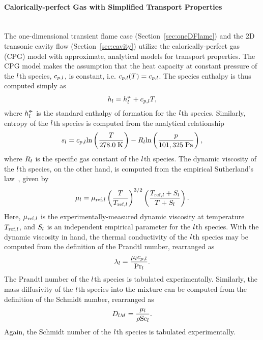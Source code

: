 \paragraph*{Calorically-perfect Gas with Simplified Transport Properties}\mbox{}\\

The one-dimensional transient flame case (Section~\ref{sec:oneDFlame}) and the 2D transonic cavity flow (Section~\ref{sec:cavity}) utilize the calorically-perfect gas (CPG) model with approximate, analytical models for transport properties. The CPG model makes the assumption that the heat capacity at constant pressure of the $l$th species, $c_{p,l}$, is constant, i.e. $c_{p,l}(T) = c_{p,l}$. The species enthalpy is thus computed simply as
%
\begin{equation}\label{eq:cpgEnthSpec}
	h_{l} = h^{\circ\kern-0.47em-}_{l} + c_{p,l} T,
\end{equation}
%
where $h^{\circ\kern-0.47em-}_{l}$ is the standard enthalpy of formation for the $l$th species. Similarly, entropy of the $l$th species is computed from the analytical relationship
%
\begin{equation}\label{eq:cpgEntropySpec}
	s_{l} = c_{p,l} \text{ln}\left(\frac{T}{278.0 \; \text{K}}\right) - R_{l} \text{ln}\left(\frac{p}{101,325 \; \text{Pa}}\right),
\end{equation}
%
where $R_{l}$ is the specific gas constant of the $l$th species. The dynamic viscosity of the $l$th species, on the other hand, is computed from the empirical Sutherland's law~\cite{Sutherland1893}, given by
%
\begin{equation}\label{eq:viscSuthSpec}
	\mu_{l} = \mu_{\text{ref},l} \left( \frac{T}{T_{\text{ref},l}} \right)^{3/2} \left( \frac{T_{\text{ref},l} + S_{l}}{T + S_{l}} \right).
\end{equation}
%
Here, $\mu_{\text{ref},l}$ is the experimentally-measured dynamic viscosity at temperature $T_{\text{ref},l}$, and $S_{l}$ is an independent empirical parameter for the $l$th species. With the dynamic viscosity in hand, the thermal conductivity of the $l$th species may be computed from the definition of the Prandtl number, rearranged as
%
\begin{equation}\label{eq:cpgThermCondSpec}
	\lambda_{l} = \frac{\mu_{l} c_{p,l}}{\text{Pr}_{l}}.
\end{equation}
%
The Prandtl number of the $l$th species is tabulated experimentally. Similarly, the mass diffusivity of the $l$th species into the mixture can be computed from the definition of the Schmidt number, rearranged as
%
\begin{equation}\label{eq:cpgMassDiffSpec}
	D_{l M} = \frac{\mu_{l}}{\rho \text{Sc}_{l}}.
\end{equation}
%
Again, the Schmidt number of the $l$th species is tabulated experimentally.

